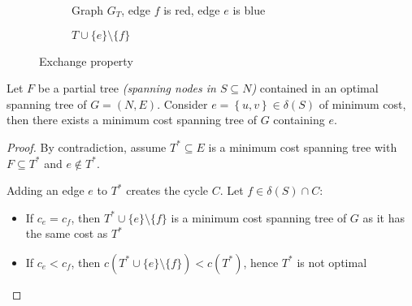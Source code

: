 \documentclass[english]{article}
\begin{document}
\begin{figure}[htbp]
  \centering
  \bigskip
  \begin{subfigure}[t]{0.495\textwidth}
    \centering
    \caption{Graph \(G_T\), edge \(f\) is red, edge \(e\) is blue}
  \end{subfigure}
  \begin{subfigure}[t]{0.495\textwidth}
    \centering
    \caption{\(T \cup \{e\} \setminus \{f\}\)}
  \end{subfigure}
  \caption{Exchange property}
  \label{fig:exchange-property}
  \bigskip
\end{figure}

\begin{minipage}{0.995\textwidth}
  \begin{property}
    Let \(F\) be a partial tree \textit{(spanning nodes in \(S \subseteq N\))} contained in an optimal spanning tree of \(G = (N, E)\).
    Consider \(e = \left\{u, v\right\} \in \delta(S)\) of minimum cost, then there exists a minimum cost spanning tree of \(G\) containing \(e\).
  \end{property}

  \begin{proof}
    By contradiction, assume \(T^\ast \subseteq E\) is a minimum cost spanning tree with \(F \subseteq T^\ast\) and \(e \notin T^\ast\).

    Adding an edge \(e\) to \(T^\ast\) creates the cycle \(C\).
    Let \(f \in \delta(S) \cap C\):

    \begin{itemize}
      \item If \(c_e = c_f\), then \(T^\ast \cup \{e\}\setminus \{f\}\) is a minimum cost spanning tree of \(G\) as it has the same cost as \(T^\ast\)
      \item If \(c_e < c_f\), then \(c \left( T^\ast \cup \{e\} \setminus \{f\} \right) < c \left(T^\ast\right)\), hence \(T^\ast\) is not optimal
    \end{itemize}
  \end{proof}
\end{minipage}
\end{document}

